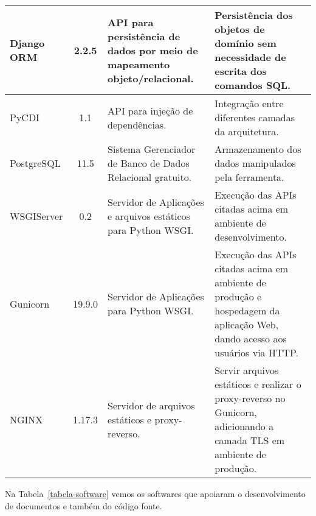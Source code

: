 \begin{table}[h]
\begin{tabular}{|p{1.6cm}|c|p{5cm}|p{6.5cm}|}
		Django ORM & 2.2.5 & API para persistência de dados por meio de mapeamento objeto/relacional. & Persistência dos objetos de domínio sem necessidade de escrita dos comandos SQL. \\\hline
		
		PyCDI & 1.1 & API para injeção de dependências. & Integração entre diferentes camadas da arquitetura. \\\hline
		
		
		
		PostgreSQL & 11.5 & Sistema Gerenciador de Banco de Dados Relacional gratuito. & Armazenamento dos dados manipulados pela ferramenta. \\\hline
		
		WSGIServer & 0.2 & Servidor de Aplicações e arquivos estáticos para Python WSGI. & Execução das APIs citadas acima em ambiente de desenvolvimento. \\ \hline
		
		Gunicorn & 19.9.0 & Servidor de Aplicações para Python WSGI. & Execução das APIs citadas acima em ambiente de produção e hospedagem da aplicação Web, dando acesso aos usuários via HTTP. \\ \hline
		
		NGINX & 1.17.3 & Servidor de arquivos estáticos e proxy-reverso. & Servir arquivos estáticos e realizar o proxy-reverso no Gunicorn, adicionando a camada TLS em ambiente de produção. \\ \hline
	\end{tabular}
\end{table}







\newpage
Na Tabela~\ref{tabela-software} vemos os softwares que apoiaram o desenvolvimento de documentos e também do código fonte.

